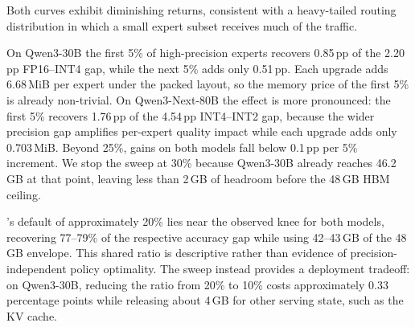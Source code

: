 Both curves exhibit diminishing returns, consistent with a heavy-tailed routing distribution in which a small expert subset receives much of the traffic.

On Qwen3-30B the first 5\% of high-precision experts recovers 0.85\,pp of the 2.20\,pp FP16--INT4 gap, while the next 5\% adds only 0.51\,pp. Each upgrade adds 6.68\,MiB per expert under the packed layout, so the memory price of the first 5\% is already non-trivial. On Qwen3-Next-80B the effect is more pronounced: the first 5\% recovers 1.76\,pp of the 4.54\,pp INT4--INT2 gap, because the wider precision gap amplifies per-expert quality impact while each upgrade adds only 0.703\,MiB. Beyond 25\%, gains on both models fall below 0.1\,pp per 5\% increment. We stop the sweep at 30\% because Qwen3-30B already reaches 46.2\,GB at that point, leaving less than 2\,GB of headroom before the 48\,GB HBM ceiling.

\systemname's default of approximately 20\% lies near the observed knee for both models, recovering 77--79\% of the respective accuracy gap while using 42--43\,GB of the 48\,GB envelope. This shared ratio is descriptive rather than evidence of precision-independent policy optimality. The sweep instead provides a deployment tradeoff: on Qwen3-30B, reducing the ratio from 20\% to 10\% costs approximately 0.33 percentage points while releasing about 4\,GB for other serving state, such as the KV cache.
